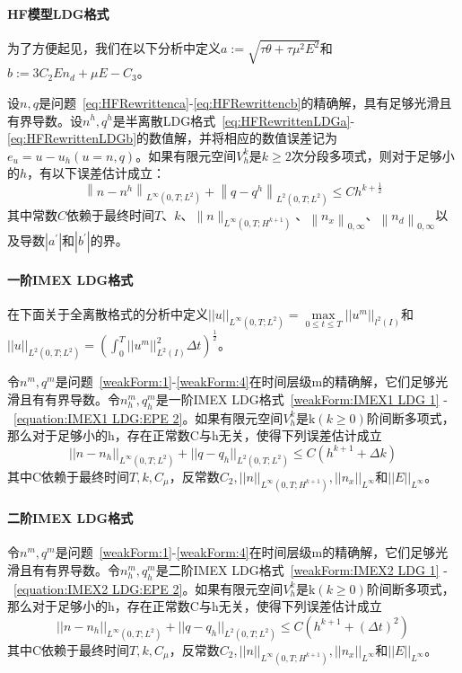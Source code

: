 \paragraph{HF模型LDG格式}
为了方便起见，我们在以下分析中定义$a:=\sqrt{\tau \theta+\tau \mu^{2} E^{2}}$和$b:=3 C_{2} E n_{d}+\mu E-C_{3}$。
\begin{theorem}
    设$n, q$是问题~\eqref{eq:HFRewrittenca}-\eqref{eq:HFRewrittencb}的精确解，具有足够光滑且有界导数。设$n^{h}, q^{h}$是半离散LDG格式~\eqref{eq:HFRewrittenLDGa}-\eqref{eq:HFRewrittenLDGb}的数值解，并将相应的数值误差记为$e_{u}=u-u_{h}(u=n, q)$。如果有限元空间$V_{h}^{k}$是$k \geq 2$次分段多项式，则对于足够小的$h$，有以下误差估计成立：
    $$
        \left\|n-n^{h}\right\|_{L^{\infty}\left(0, T ; L^{2}\right)}+\left\|q-q^{h}\right\|_{L^{2}\left(0, T ; L^{2}\right)} \leq C h^{k+\frac{1}{2}}
    $$
    其中常数$C$依赖于最终时间$T$、$k$、$\|n\|_{L^{\infty}\left(0, T ; H^{k+1}\right)}$、$\left\|n_{x}\right\|_{0, \infty}$、$\left\|n_{d}\right\|_{0, \infty}$以及导数$\left|a^{\prime}\right|$和$\left|b^{\prime}\right|$的界。
\end{theorem}
\paragraph{一阶IMEX LDG格式}
在下面关于全离散格式的分析中定义$||u||_{L^{\infty}(0,T;L^2)}  = \max \limits_{0 \leq t \leq T}||u^m||_{l^2(I)}$和$||u||_{L^2(0,T;L^2)} = (\int_{0}^{T}||u^m||_{L^2(I)}^2\Delta t)^{\frac{1}{2}}$。
\begin{theorem}
    令$n^m,q^m$是问题~\eqref{weakForm:1}-\eqref{weakForm:4}在时间层级m的精确解，它们足够光滑且有有界导数。令$n_h^m,q_h^m$是一阶IMEX LDG格式~\eqref{weakForm:IMEX1 LDG 1} - ~\eqref{equation:IMEX1 LDG:EPE 2}。如果有限元空间$V_h^k$是k$(k\geq  0)$阶间断多项式，那么对于足够小的h，存在正常数C与h无关，使得下列误差估计成立
    \begin{equation}
        ||n-n_h||_{L^{\infty}(0,T;L^2)} + ||q - q_h||_{L^2(0,T;L^2)} \leq C(h^{k+1} + \Delta k)
    \end{equation}
    其中C依赖于最终时间$T,k,C_{\mu}$，反常数$C_2, ||n||_{L^{\infty}(0,T;H^{k+1})}, ||n_x||_{L^{\infty}}$和$||E||_{L^{\infty}}$。
\end{theorem}

\paragraph{二阶IMEX LDG格式}
\begin{theorem}
    令$n^m,q^m$是问题~\eqref{weakForm:1}-\eqref{weakForm:4}在时间层级m的精确解，它们足够光滑且有有界导数。令$n_h^m,q_h^m$是二阶IMEX LDG格式~\eqref{weakForm:IMEX2 LDG 1} - ~\eqref{equation:IMEX2 LDG:EPE 2}。如果有限元空间$V_h^k$是k$(k\geq  0)$阶间断多项式，那么对于足够小的h，存在正常数C与h无关，使得下列误差估计成立
    \begin{equation}
        ||n-n_h||_{L^{\infty}(0,T;L^2)} + ||q - q_h||_{L^2(0,T;L^2)} \leq C(h^{k+1} + (\Delta t)^2)
    \end{equation}
    其中C依赖于最终时间$T,k,C_{\mu}$，反常数$C_2, ||n||_{L^{\infty}(0,T;H^{k+1})}, ||n_x||_{L^{\infty}}$和$||E||_{L^{\infty}}$。
\end{theorem}

